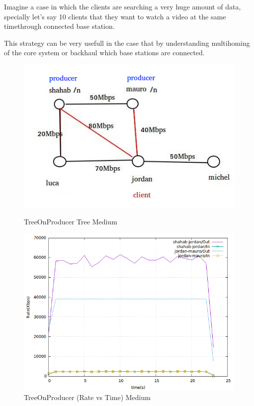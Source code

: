Imagine a case in which the clients are searching a very huge amount of data, specially let's say 10 clients that they want to watch a video at the same timethrough connected base station.

This strategy can be very usefull in the case that by understanding multihoming of the core system or backhaul which base stations are connected.

\begin{figure}[H]

\begin{center}

\includegraphics[scale = 0.4]{Figures/TreeOnProducer.png}

\caption{TreeOnProducer Tree Medium} \label{TreeOnProducer} 


\includegraphics[scale = 0.4]{Figures/treeonproducer.png}

\caption{TreeOnProducer (Rate vs Time) Medium} \label{treeonproducer} 


\end{center}

\end{figure}

